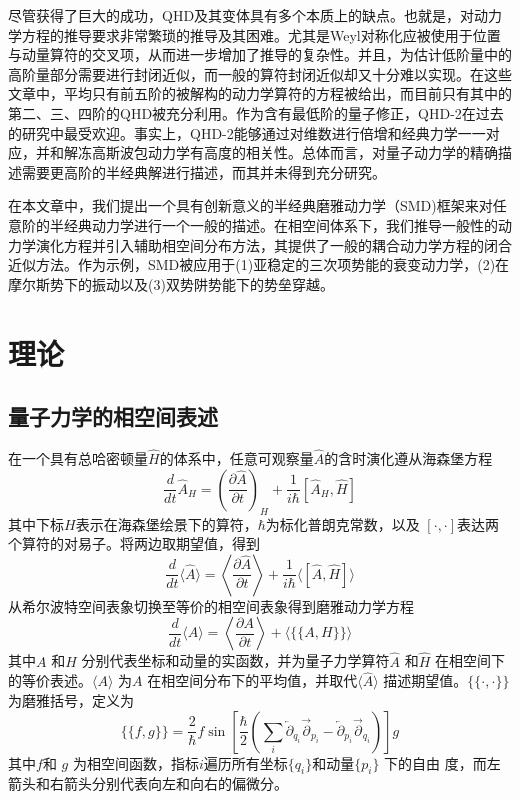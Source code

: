 尽管获得了巨大的成功，QHD及其变体具有多个本质上的缺点。也就是，对动力学方程的推导要求非常繁琐的推导及其困难。尤其是Weyl对称化应被使用于位置与动量算符的交叉项，从而进一步增加了推导的复杂性。并且，为估计低阶量中的高阶量部分需要进行封闭近似，而一般的算符封闭近似却又十分难以实现。在这些文章中，平均只有前五阶的被解构的动力学算符的方程被给出，而目前只有其中的第二、三、四阶的QHD被充分利用。作为含有最低阶的量子修正，QHD-2在过去的研究中最受欢迎。事实上，QHD-2能够通过对维数进行倍增和经典力学一一对应，并和解冻高斯波包动力学有高度的相关性。总体而言，对量子动力学的精确描述需要更高阶的半经典解进行描述，而其并未得到充分研究。

在本文章中，我们提出一个具有创新意义的半经典磨雅动力学（SMD)框架来对任意阶的半经典动力学进行一个一般的描述。在相空间体系下，我们推导一般性的动力学演化方程并引入辅助相空间分布方法，其提供了一般的耦合动力学方程的闭合近似方法。作为示例，SMD被应用于(1)亚稳定的三次项势能的衰变动力学，(2)在摩尔斯势下的振动以及(3)双势阱势能下的势垒穿越。

\section{理论}
\subsection{量子力学的相空间表述}
在一个具有总哈密顿量$\hat{H}$的体系中，任意可观察量$\hat{A}$的含时演化遵从海森堡方程
\begin{equation}
	\frac{d}{d t} \hat{A}_{H}=\left(\frac{\partial \hat{A}}{\partial t}\right)_{H}+\frac{1}{i \hbar}\left[\hat{A}_{H}, \hat{H}\right]
\end{equation}
其中下标$H$表示在海森堡绘景下的算符，$\hbar$为标化普朗克常数，以及 $[\cdot,\cdot]$表达两个算符的对易子。将两边取期望值，得到
 \begin{equation}
	\frac{d}{d t}\langle\hat{A}\rangle=\left\langle\frac{\partial \hat{A}}{\partial t}\right\rangle+\frac{1}{i \hbar}\langle[\hat{A}, \hat{H}]\rangle
	\label{Heisenberg}
\end{equation}
从希尔波特空间表象切换至等价的相空间表象得到磨雅动力学方程
\begin{equation}
	\frac{d}{d t}\langle A\rangle=\left\langle\frac{\partial A}{\partial t}\right\rangle+\langle\{\{A, H\}\}\rangle
	\label{Ehrenfest}
\end{equation}
其中$A$ 和$H$ 分别代表坐标和动量的实函数，并为量子力学算符$\hat{A}$ 和$\hat{H}$ 在相空间下的等价表述。$\langle A \rangle $ 为$A$ 在相空间分布下的平均值，并取代$\langle \hat{A} \rangle $ 描述期望值。$\{\{\cdot, \cdot\}\}$为磨雅括号，定义为
 \begin{equation}
	 \{\{f, g\}\}=\frac{2}{\hbar} f \sin \left[\frac{\hbar}{2}\left(\sum_{i} \overleftarrow{\partial}_{q_{i}} \overrightarrow{\partial}_{p_{i}}-\overleftarrow{\partial}_{p_{i}} \overrightarrow{\partial}_{q_{i}}\right)\right] g
\end{equation}
其中$f$和 $g$ 为相空间函数，指标$i$遍历所有坐标$\{q_i\}$和动量$\{p_i\}$ 下的自由 度，而左箭头和右箭头分别代表向左和向右的偏微分。

